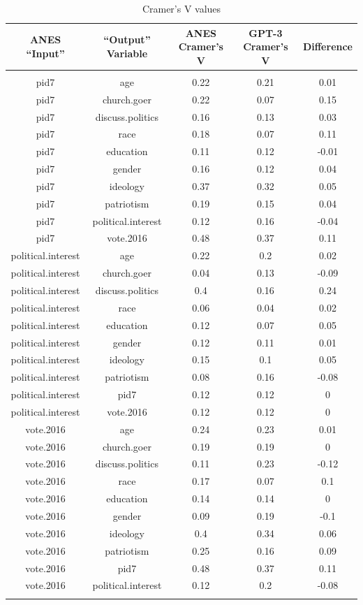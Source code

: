 \documentclass[11pt]{article}
\begin{document}
\begin{table}[!htbp] \centering

\begin{tabular}{@{\extracolsep{5pt}} ccccc}
\toprule{}
ANES ``Input'' & ``Output'' Variable & ANES Cramer's V & GPT-3 Cramer's V & Difference \\
\hline \\[-1.8ex]
pid7 & age & 0.22 & 0.21 & 0.01 \\
pid7 & church.goer & 0.22 & 0.07 & 0.15 \\
pid7 & discuss.politics & 0.16 & 0.13 & 0.03 \\
pid7 & race & 0.18 & 0.07 & 0.11 \\
pid7 & education & 0.11 & 0.12 & -0.01 \\
pid7 & gender & 0.16 & 0.12 & 0.04 \\
pid7 & ideology & 0.37 & 0.32 & 0.05 \\
pid7 & patriotism & 0.19 & 0.15 & 0.04 \\
pid7 & political.interest & 0.12 & 0.16 & -0.04 \\
pid7 & vote.2016 & 0.48 & 0.37 & 0.11 \\
political.interest & age & 0.22 & 0.2 & 0.02 \\
political.interest & church.goer & 0.04 & 0.13 & -0.09 \\
political.interest & discuss.politics & 0.4 & 0.16 & 0.24 \\
political.interest & race & 0.06 & 0.04 & 0.02 \\
political.interest & education & 0.12 & 0.07 & 0.05 \\
political.interest & gender & 0.12 & 0.11 & 0.01 \\
political.interest & ideology & 0.15 & 0.1 & 0.05 \\
political.interest & patriotism & 0.08 & 0.16 & -0.08 \\
political.interest & pid7 & 0.12 & 0.12 & 0 \\
political.interest & vote.2016 & 0.12 & 0.12 & 0 \\
vote.2016 & age & 0.24 & 0.23 & 0.01 \\
vote.2016 & church.goer & 0.19 & 0.19 & 0 \\
vote.2016 & discuss.politics & 0.11 & 0.23 & -0.12 \\
vote.2016 & race & 0.17 & 0.07 & 0.1 \\
vote.2016 & education & 0.14 & 0.14 & 0 \\
vote.2016 & gender & 0.09 & 0.19 & -0.1 \\
vote.2016 & ideology & 0.4 & 0.34 & 0.06 \\
vote.2016 & patriotism & 0.25 & 0.16 & 0.09 \\
vote.2016 & pid7 & 0.48 & 0.37 & 0.11 \\
vote.2016 & political.interest & 0.12 & 0.2 & -0.08 \\
\bottomrule{}
\end{tabular}
  \caption{Cramer's V values}
  \label{tab:cramersvnumbers3}
\end{table}
\end{document}
